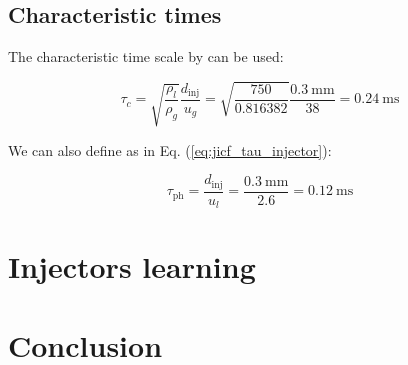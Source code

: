\subsection{Characteristic times}

The characteristic time scale by  can be used:

\begin{equation}
\tau_c = \sqrt{\frac{\rho_l}{\rho_g}} \frac{d_\mathrm{inj}}{u_g} = \sqrt{\frac{750}{0.816382 }} \frac{0.3 ~\mathrm{mm}}{38} = 0.24 ~\mathrm{ms}
\end{equation}

We can also define as in Eq. (\ref{eq:jicf_tau_injector}):

\begin{equation}
\tau_\mathrm{ph} = \frac{d_\mathrm{inj}}{u_l} = \frac{0.3 ~\mathrm{mm}}{2.6} = 0.12 ~\mathrm{ms}
\end{equation}

%
%

\section{Injectors learning}

\section{Conclusion}
